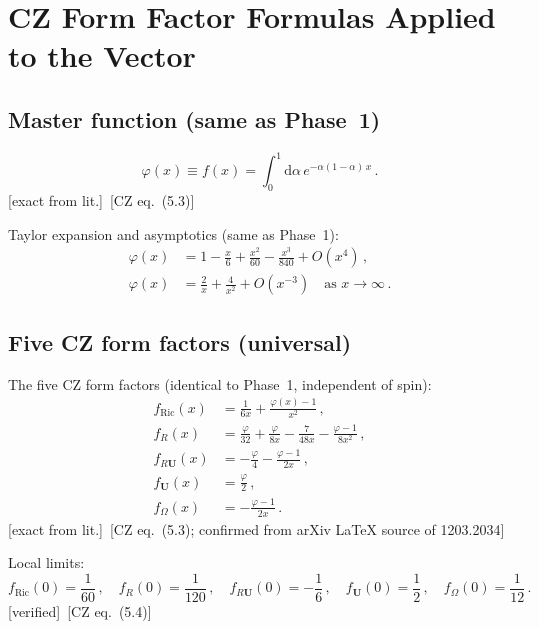 \documentclass[12pt,a4paper]{article}
\theoremstyle{definition}
\theoremstyle{remark}
\newcommand{\dd}{\mathrm{d}}
\newcommand{\fromlit}[1]{\textcolor{blue!70!black}{\textsf{[#1]}}}
\newcommand{\exactlit}{\textcolor{blue!60!black}{\textsf{[exact from lit.]}}}
\newcommand{\verified}{\textcolor{green!50!black}{\textsf{[verified]}}}
\begin{document}
\section{CZ Form Factor Formulas Applied to the Vector}
\label{sec:CZ-formulas}

\subsection{Master function (same as Phase~1)}

\begin{equation}
  \varphi(x) \equiv f(x) = \int_0^1 \dd\alpha\,e^{-\alpha(1-\alpha)\,x}\,.
  \label{eq:master-function}
\end{equation}
\exactlit\ \fromlit{CZ eq.~(5.3)}

Taylor expansion and asymptotics (same as Phase~1):
\begin{align}
  \varphi(x) &= 1 - \frac{x}{6} + \frac{x^2}{60}
  - \frac{x^3}{840} + O(x^4)\,,
  \label{eq:phi-taylor}\\
  \varphi(x) &= \frac{2}{x} + \frac{4}{x^2} + O(x^{-3})
  \quad\text{as } x \to \infty\,.
  \label{eq:phi-asymptotic}
\end{align}

\subsection{Five CZ form factors (universal)}

The five CZ form factors (identical to Phase~1, independent of spin):
\begin{align}
  f_{\mathrm{Ric}}(x) &= \frac{1}{6x}
    + \frac{\varphi(x) - 1}{x^2}\,,
  \label{eq:f-Ric}\\[4pt]
  f_R(x) &= \frac{\varphi}{32} + \frac{\varphi}{8x}
    - \frac{7}{48x} - \frac{\varphi - 1}{8x^2}\,,
  \label{eq:f-R}\\[4pt]
  f_{R\mathbf{U}}(x) &= -\frac{\varphi}{4}
    - \frac{\varphi - 1}{2x}\,,
  \label{eq:f-RU}\\[4pt]
  f_{\mathbf{U}}(x) &= \frac{\varphi}{2}\,,
  \label{eq:f-U}\\[4pt]
  f_\Omega(x) &= -\frac{\varphi - 1}{2x}\,.
  \label{eq:f-Omega}
\end{align}
\exactlit\ \fromlit{CZ eq.~(5.3); confirmed from arXiv LaTeX source
of 1203.2034}

Local limits:
\begin{equation}
  \boxed{
  f_{\mathrm{Ric}}(0) = \frac{1}{60}\,,\quad
  f_R(0) = \frac{1}{120}\,,\quad
  f_{R\mathbf{U}}(0) = -\frac{1}{6}\,,\quad
  f_{\mathbf{U}}(0) = \frac{1}{2}\,,\quad
  f_\Omega(0) = \frac{1}{12}\,.
  }
  \label{eq:f-at-0}
\end{equation}
\verified\ \fromlit{CZ eq.~(5.4)}
\end{document}

